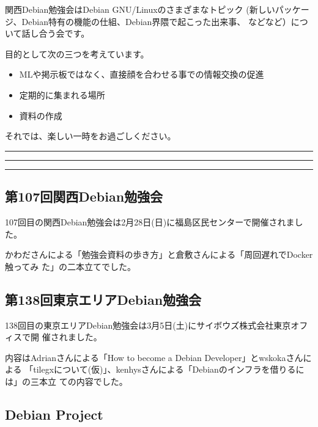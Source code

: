 \documentclass[mingoth,a4paper]{jsarticle}
\begin{document}
\vspace{1em}

関西Debian勉強会はDebian GNU/Linuxのさまざまなトピック
(新しいパッケージ、Debian特有の機能の仕組、Debian界隈で起こった出来事、
などなど）について話し合う会です。

目的として次の三つを考えています。
\begin{itemize}
\item MLや掲示板ではなく、直接顔を合わせる事での情報交換の促進
\item 定期的に集まれる場所
\item 資料の作成
\end{itemize}

 それでは、楽しい一時をお過ごしください。

\newpage

\begin{minipage}[b]{0.2\hsize}
  {}
\end{minipage}
\begin{minipage}[b]{0.8\hsize}
\hrule
\vspace{2mm}
\hrule
\setcounter{tocdepth}{1}
\tableofcontents
\vspace{2mm}
\hrule
\end{minipage}


\subsection{第107回関西Debian勉強会}

107回目の関西Debian勉強会は2月28日(日)に福島区民センターで開催されました。

かわださんによる「勉強会資料の歩き方」と倉敷さんによる「周回遅れでDocker触ってみ
た」の二本立てでした。

\subsection{第138回東京エリアDebian勉強会}

138回目の東京エリアDebian勉強会は3月5日(土)にサイボウズ株式会社東京オフィスで開
催されました。

内容はAdrianさんによる「How to become a Debian Developer」とwskokaさんによる
「tilegxについて(仮)」、kenhysさんによる「Debianのインフラを借りるには」の三本立
ての内容でした。

\subsection{Debian Project}
\end{document}
